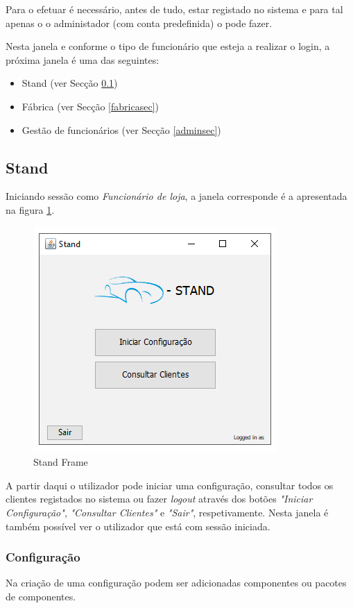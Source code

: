 \documentclass[11pt]{article} %
\begin{document}
Para o efetuar é necessário, antes de tudo, estar registado no sistema e para tal apenas o o administador (com conta predefinida) o pode fazer. 

Nesta janela e conforme o tipo de funcionário que esteja a realizar o login, a próxima janela é uma das seguintes:
\begin{itemize}
	\item Stand (ver Secção \ref{standsec})
	\item Fábrica (ver Secção \ref{fabricasec})
	\item Gestão de funcionários (ver Secção \ref{adminsec})
\end{itemize}

\subsection{Stand}
\label{standsec}

Iniciando sessão como \textit{Funcionário de loja}, a janela corresponde é a apresentada na figura \ref{standframe}.
\begin{figure}[H]
	\centering
	\includegraphics[]{standframe.png}
	\caption{Stand Frame}
	\label{standframe}
\end{figure}

A partir daqui o utilizador pode iniciar uma configuração, consultar todos os clientes registados no sistema ou fazer \textit{logout} através dos botões \textit{"Iniciar Configuração"}, \textit{"Consultar Clientes"} e \textit{"Sair"}, respetivamente. Nesta janela é também possível ver o utilizador que está com sessão iniciada.

\subsubsection{Configuração}
Na criação de uma configuração podem ser adicionadas componentes ou pacotes de componentes.
\end{document}

